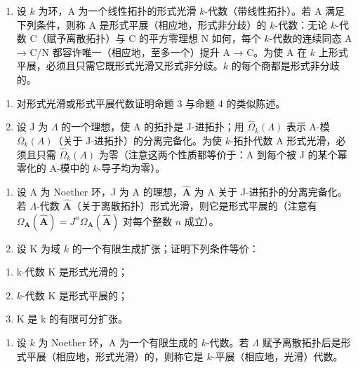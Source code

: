 
\begin{enumerate}
\def\labelenumi{\arabic{enumi})}
\tightlist
\item
  设 \(k\) 为环，A 为一个线性拓扑的形式光滑 \(k\)-代数（带线性拓扑）。若 A 满足下列条件，则称 A 是形式平展（相应地，形式非分歧）的 \(k\)-代数：无论 \(k\)-代数 C（赋予离散拓扑）与 C 的平方零理想 N 如何，每个 \(k\)-代数的连续同态 A → C/N 都容许唯一（相应地，至多一个）提升 A → C。为使 A 在 \(k\) 上形式平展，必须且只需它既形式光滑又形式非分歧。\(k\) 的每个商都是形式非分歧的。
\end{enumerate}

\begin{enumerate}
\def\labelenumi{\alph{enumi})}
\item
  对形式光滑或形式平展代数证明命题 3 与命题 4 的类似陈述。
\item
  设 J 为 \(\Lambda\) 的一个理想，使 A 的拓扑是 J-进拓扑；用 \(\widehat{\Omega}_{k}(\Lambda)\) 表示 A-模 \(\Omega_{k}(A)\)（关于 J-进拓扑）的分离完备化。为使 \(k\)-拓扑代数 A 形式光滑，必须且只需 \(\widehat{\Omega}_{k}(A)\) 为零（注意这两个性质都等价于：A 到每个被 J 的某个幂零化的 A-模中的 \(k\)-导子均为零）。
\end{enumerate}

\begin{enumerate}
\def\labelenumi{\arabic{enumi})}
\setcounter{enumi}{1}
\item
  设 A 为 Noether 环，J 为 A 的理想，\(\widehat{\mathbf{A}}\) 为 A 关于 J-进拓扑的分离完备化。若 \(\Lambda\)-代数 \(\widehat{\mathbf{A}}\)（关于离散拓扑）形式光滑，则它是形式平展的（注意有 \(\Omega_{\mathbf{A}}(\widehat{\mathbf{A}}) = J^{n}\Omega_{\mathbf{A}}(\widehat{\mathbf{A}})\) 对每个整数 \(n\) 成立）。
\item
  设 K 为域 \(k\) 的一个有限生成扩张；证明下列条件等价：
\end{enumerate}

\begin{enumerate}
\def\labelenumi{(\roman{enumi})}
\item
  k-代数 K 是形式光滑的；
\item
  \(k\)-代数 K 是形式平展的；
\item
  K 是 k 的有限可分扩张。
\end{enumerate}

\begin{enumerate}
\def\labelenumi{\arabic{enumi})}
\setcounter{enumi}{3}
\tightlist
\item
  设 \(k\) 为 Noether 环，A 为一个有限生成的 \(k\)-代数。若 \(\Lambda\) 赋予离散拓扑后是形式平展（相应地，形式光滑）的，则称它是 \(k\)-平展（相应地，光滑）代数。
\end{enumerate}


